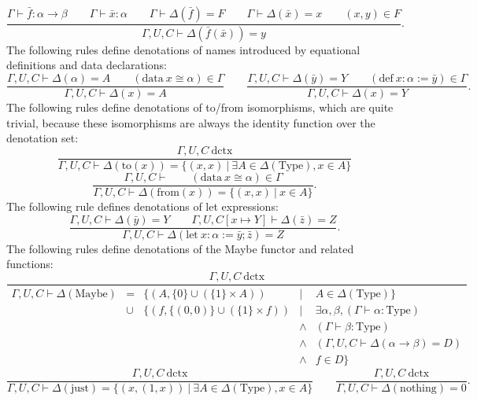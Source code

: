 \documentclass[11pt]{article}
\begin{document}
\begin{equation}
	\frac{
		\Gamma \vdash \bar{f} : \alpha \to \beta
		\qquad \Gamma \vdash \bar{x} : \alpha
		\qquad \Gamma \vdash \Delta(\bar{f}) = F
		\qquad \Gamma \vdash \Delta(\bar{x}) = x
		\qquad (x,y) \in F
	}{\Gamma,U,C \vdash \Delta(\bar{f}(\bar{x})) = y}.
\end{equation}
The following rules define denotations of names
introduced by equational definitions and data declarations:
\begin{equation}
	\frac{\Gamma,U,C \vdash \Delta(\alpha) = A
	\qquad (\text{data}\ x \cong \alpha) \in \Gamma}
	{\Gamma,U,C \vdash \Delta(x) = A}
	\qquad
	\frac{\Gamma,U,C \vdash \Delta(\bar{y}) = Y
	\qquad (\text{def}\ x : \alpha := \bar{y}) \in \Gamma}
	{\Gamma,U,C \vdash \Delta(x) = Y}.
\end{equation}
The following rules define denotations of to/from isomorphisms,
which are quite trivial, because these isomorphisms are always
the identity function over the denotation set:
\begin{equation}
	\frac{\Gamma,U,C\ \text{dctx}}
	{\Gamma,U,C \vdash \Delta(\text{to}(x)) =
	\{(x,x)\ |\ \exists A \in \Delta(\text{Type}), x \in A\}}
\end{equation}
\begin{equation}
	\frac{\Gamma,U,C \vdash
	\qquad (\text{data}\ x \cong \alpha) \in \Gamma}
	{\Gamma,U,C \vdash \Delta(\text{from}(x)) =
	\{(x,x)\ |\ x \in A\}}.
\end{equation}
The following rule defines denotations of let expressions:
\begin{equation}
	\frac{
		\Gamma,U,C \vdash \Delta(\bar{y}) = Y
		\qquad
		\Gamma,U,C[x \mapsto Y] \vdash \Delta(\bar{z}) = Z
	}{\Gamma,U,C \vdash \Delta(\text{let}\ x : \alpha := \bar{y}; \bar{z})
	= Z}.
\end{equation}
The following rules define denotations of the Maybe functor
and related functions:
\begin{equation}
	\frac{\Gamma,U,C\ \text{dctx}}
	{
		\begin{array}{rclcl}
			\Gamma,U,C \vdash \Delta(\text{Maybe})
			&=
			& \{(A, \{0\} \cup (\{1\} \times A))
			& |
			& A \in \Delta(\text{Type})
			\}
			\\ &\cup
			&\{(f, \{(0,0)\} \cup (\{1\} \times f))
			& |
			& \exists \alpha, \beta, (\Gamma \vdash \alpha : \text{Type})
			\\ &&& \wedge
			& (\Gamma \vdash \beta : \text{Type})
			\\ &&& \wedge
			& (\Gamma,U,C \vdash \Delta(\alpha \to \beta) = D)
			\\ &&& \wedge
			& f \in D\}
		\end{array}
	}
\end{equation}
\begin{equation}
	\frac{\Gamma,U,C\ \text{dctx}}
	{\Gamma,U,C \vdash \Delta(\text{just}) = \{(x,(1,x))\ |\ \exists A \in \Delta(\text{Type}), x \in A\}}
	\qquad
	\frac{\Gamma,U,C\ \text{dctx}}
	{\Gamma,U,C \vdash \Delta(\text{nothing}) = 0}.
\end{equation}
\end{document}
